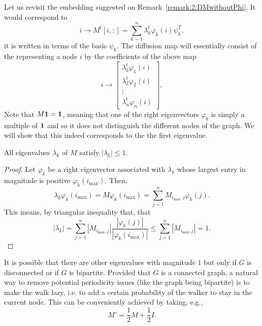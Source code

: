 Let us revisit the embedding suggested on Remark~\ref{remark:2:DMwithoutPhi}. It would correspond to
\[
i \to M^t[i,:] = \sum_{k=1}^n \lambda_k^t \varphi_k(i) \psi_k^T,
\]
it is written in terms of the basis $\psi_k$. The diffusion map will essentially consist of the representing a node $i$ by the coefficients of the above map
\begin{equation}\label{eq:2:DM:withcoordinate1}
i \to %
 \left[ \begin{array}{c} \lambda_1^t \varphi_1(i) \\ \lambda_2^t \varphi_2(i) \\ \vdots \\ \lambda_n^t \varphi_n(i) \end{array} \right],
\end{equation}
Note that $M\mathbf{1} = \mathbf{1}$, meaning that one of the right eigenvectors $\varphi_k$ is simply a multiple of $\mathbf{1}$ and so it does not distinguish the different nodes of the graph. We will show that this indeed corresponds to the the first eigenvalue.

\begin{proposition}
All eigenvalues $\lambda_k$ of $M$ satisfy $\left|\lambda_k\right| \leq 1$.
\end{proposition}

\begin{proof}

Let $\varphi_k$ be a right eigenvector associated with $\lambda_k$ whose largest entry in magnitude is positive $\varphi_k\left(i_{\max}\right)$. Then,
\[
\lambda_k \varphi_k\left(i_{\max}\right) = M \varphi_k\left(i_{\max}\right) =  \sum_{j=1}^n M_{i_{\max}, j} \varphi_k\left(j\right).
\]
This means, by triangular inequality that, that
\[
\left| \lambda_k \right| = \sum_{j=1}^n \left| M_{i_{\max}, j} \right| \frac{\left|\varphi_k\left(j\right)\right|}{\left|\varphi_k\left(i_{\max}\right)\right|} \leq \sum_{j=1}^n \left| M_{i_{\max}, j} \right| = 1.
\]

\end{proof}

\begin{remark}\label{remark:lazyDMaps}
It is possible that there are other eigenvalues with magnitude $1$ but only if $G$ is disconnected or if $G$ is bipartite. Provided that $G$ is a connected graph, a natural way to remove potential periodicity issues (like the graph being bipartite) is to make the walk lazy, i.e. to add a certain probability of the walker to stay in the current node. This can be conveniently achieved by taking, e.g.,
\[
M' = \frac12 M + \frac12 I.
\]
\end{remark}

